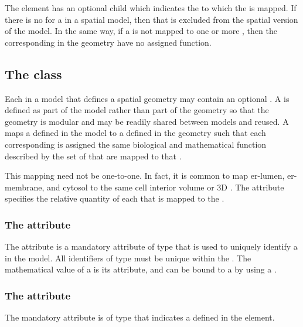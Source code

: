 The \Compartment element has an optional \CompartmentMapping child which indicates the \DomainType to which the \Compartment is mapped.  If there is no \CompartmentMapping for a \Compartment in a spatial model, then that \Compartment is excluded from the spatial version of the model.  In the same way, if a \DomainType is not mapped to one or more \Compartments, then the corresponding \Domains in the geometry have no assigned function.


\subsection{The  class}
\label{CompartmentMapping-class}
Each \Compartment in a model that defines a spatial geometry may contain an optional \CompartmentMapping. A \CompartmentMapping is defined as part of the model rather than part of the geometry so that the geometry is modular and may be readily shared between models and reused.  A \CompartmentMapping maps a \Compartment defined in the model to a \DomainType defined in the geometry such that each corresponding \DomainType is assigned the same biological and mathematical function described by the set of \Compartments that are mapped to that \DomainType. 

This mapping need not be one-to-one.  In fact, it is common to map er-lumen, er-membrane, and cytosol to the same cell interior volume or 3D \DomainType.  The  attribute specifies the relative quantity of each \Compartment that is mapped to the \DomainType.

\subsubsection{The  attribute}
The  attribute is a mandatory attribute of type  that is used to uniquely identify a \CompartmentMapping in the model.  All identifiers of type  must be unique within the \Geometry.  The mathematical value of a \CompartmentMapping is its  attribute, and can be bound to a \Parameter by using a \SpatialSymbolReference.

\subsubsection{The  attribute}
The mandatory  attribute is of type  that indicates a \DomainType defined in the \Geometry element.

